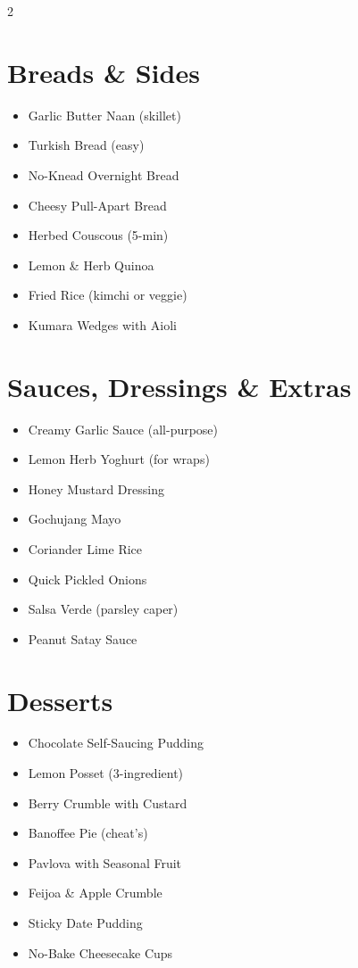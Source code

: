 \documentclass[13pt,a4paper]{book}
\begin{document}
\begin{multicols}{2}
\section*{Breads \& Sides}
\begin{itemize}
\item Garlic Butter Naan (skillet)
\item Turkish Bread (easy)
\item No-Knead Overnight Bread
\item Cheesy Pull-Apart Bread
\item Herbed Couscous (5-min)
\item Lemon \& Herb Quinoa
\item Fried Rice (kimchi or veggie)
\item Kumara Wedges with Aioli
\end{itemize}

\section*{Sauces, Dressings \& Extras}
\begin{itemize}
\item Creamy Garlic Sauce (all-purpose)
\item Lemon Herb Yoghurt (for wraps)
\item Honey Mustard Dressing
\item Gochujang Mayo
\item Coriander Lime Rice
\item Quick Pickled Onions
\item Salsa Verde (parsley caper)
\item Peanut Satay Sauce
\end{itemize}

\section*{Desserts}
\begin{itemize}
\item Chocolate Self-Saucing Pudding
\item Lemon Posset (3-ingredient)
\item Berry Crumble with Custard
\item Banoffee Pie (cheat’s)
\item Pavlova with Seasonal Fruit
\item Feijoa \& Apple Crumble
\item Sticky Date Pudding
\item No-Bake Cheesecake Cups
\end{itemize}

\end{multicols} 
\end{document}
